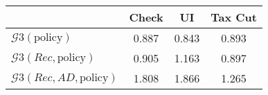 \begin{tabular}{@{}lccc@{}}
\toprule
                          & Check      & UI    & Tax Cut    \\  \midrule
$\mathcal{G}3(\text{policy})$ & 0.887  & 0.843  & 0.893     \\
$\mathcal{G}3(Rec,\text{policy})$ & 0.905  & 1.163  & 0.897     \\
$\mathcal{G}3(Rec, AD,\text{policy})$ & 1.808  & 1.866  & 1.265     \\
\end{tabular}
